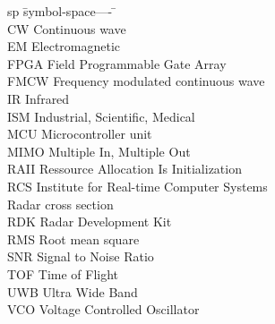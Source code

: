 \begin{listofabbrevs}
\begin{tabbing}

sp	\= symbol-space---- \= \kill \+ \\


CW \> Continuous wave \\
EM \> Electromagnetic \\
FPGA \> Field Programmable Gate Array \\
FMCW \> Frequency modulated continuous wave \\
IR \> Infrared \\
ISM \> Industrial, Scientific, Medical \\
MCU \> Microcontroller unit \\
MIMO \> Multiple In, Multiple Out \\
RAII \> Ressource Allocation Is Initialization \\
RCS \> Institute for Real-time Computer Systems \\
   	\> Radar cross section \\
RDK \> Radar Development Kit \\
RMS \> Root mean square \\
SNR \> Signal to Noise Ratio \\
TOF \> Time of Flight \\
UWB \> Ultra Wide Band \\
VCO \> Voltage Controlled Oscillator \\

\end{tabbing}
\end{listofabbrevs}
